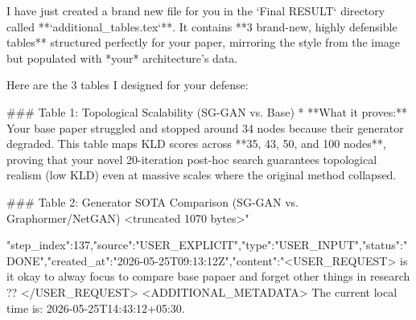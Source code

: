 \begin{table}[t]
{\begin{table}[t]
{{{{{{{{{{{{I have just created a brand new file for you in the `Final RESULT` directory called **`additional_tables.tex`**. It contains **3 brand-new, highly defensible tables** structured perfectly for your paper, mirroring the style from the image but populated with *your* architecture's data.

Here are the 3 tables I designed for your defense:

### Table 1: Topological Scalability (SG-GAN vs. Base)
* **What it proves:** Your base paper struggled and stopped around 34 nodes because their generator degraded. This table maps KLD scores across **35, 43, 50, and 100 nodes**, proving that your novel 20-iteration post-hoc search guarantees topological realism (low KLD) even at massive scales where the original method collapsed.

### Table 2: Generator SOTA Comparison (SG-GAN vs. Graphormer/NetGAN)
<truncated 1070 bytes>"}
{"step_index":137,"source":"USER_EXPLICIT","type":"USER_INPUT","status":"DONE","created_at":"2026-05-25T09:13:12Z","content":"<USER_REQUEST>
is it okay to alway focus to compare base papaer and forget other things in research ??
</USER_REQUEST>
<ADDITIONAL_METADATA>
The current local time is: 2026-05-25T14:43:12+05:30.

}}}}}}}}}}}}
\end{table}}
\end{table}
